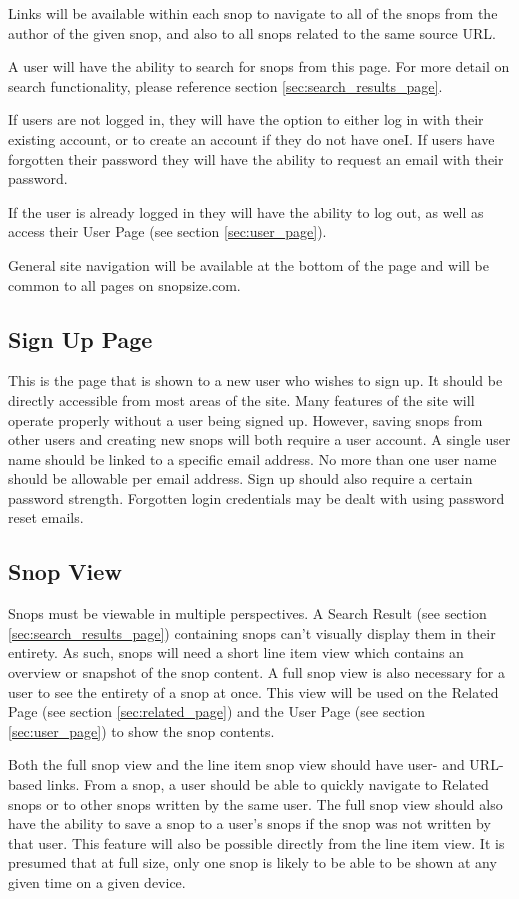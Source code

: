 \documentclass[11pt]{article}
\begin{document}
Links will be available within each snop to navigate to all of the snops from the author of the given snop, and also to all snops related to the same source URL.

A user will have the ability to search for snops from this page. For more detail on search functionality, please reference section \ref{sec:search_results_page}. 

If users are not logged in, they will have the option to either log in with their existing account, or to create an account if they do not have oneI. If users have forgotten their password they will have the ability to request an email with their password.

If the user is already logged in they will have the ability to log out, as well as access their User Page (see section \ref{sec:user_page}). 

General site navigation will be available at the bottom of the page and will be common to all pages on snopsize.com.
\subsection{Sign Up Page}
This is the page that is shown to a new user who wishes to sign up. It should be directly accessible from most areas of the site. Many features of the site will operate properly without a user being signed up. However, saving snops from other users and creating new snops will both require a user account. A single user name should be linked to a specific email address. No more than one user name should be allowable per email address. Sign up should also require a certain password strength. Forgotten login credentials may be dealt with using password reset emails.
\subsection{Snop View}
Snops must be viewable in multiple perspectives. A Search Result (see section \ref{sec:search_results_page}) containing snops can't visually display them in their entirety. As such, snops will need a short line item view which contains an overview or snapshot of the snop content. A full snop view is also necessary for a user to see the entirety of a snop at once. This view will be used on the Related Page (see section \ref{sec:related_page}) and the User Page (see section \ref{sec:user_page}) to show the snop contents. 

Both the full snop view and the line item snop view should have user- and URL-based links. From a snop, a user should be able to quickly navigate to Related snops or to other snops written by the same user. The full snop view should also have the ability to save a snop to a user's snops if the snop was not written by that user. This feature will also be possible directly from the line item view. It is presumed that at full size, only one snop is likely to be able to be shown at any given time on a given device.
\end{document}
